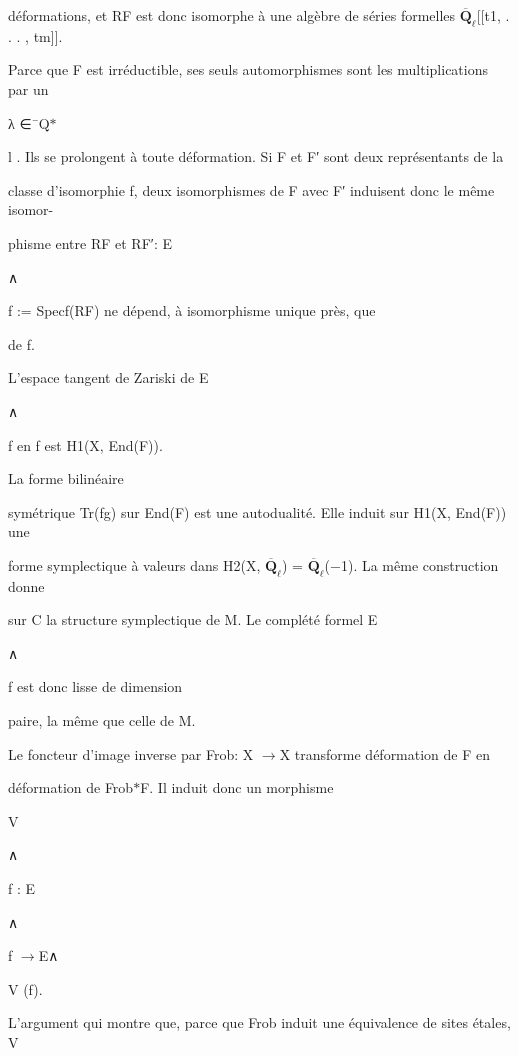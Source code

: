 \documentclass[11pt]{article}
\begin{document}
\noindent déformations, et RF est donc isomorphe à une algèbre de séries formelles \(\overline{\mathbf Q}_{\ell}\)[[t1, . . . , tm]].\par
\noindent Parce que F est irréductible, ses seuls automorphismes sont les multiplications par un\par
\noindent λ ∈¯Q\(*\)\par
\noindent l . Ils se prolongent à toute déformation. Si F et F′ sont deux représentants de la\par
\noindent classe d’isomorphie f, deux isomorphismes de F avec F′ induisent donc le même isomor-\par
\noindent phisme entre RF et RF′: E\par
\noindent ∧\par
\noindent f := Specf(RF) ne dépend, à isomorphisme unique près, que\par
\noindent de f.\par
\noindent L’espace tangent de Zariski de E\par
\noindent ∧\par
\noindent f en f est H1(X, End(F)).\par
\noindent La forme bilinéaire\par
\noindent symétrique Tr(fg) sur End(F) est une autodualité. Elle induit sur H1(X, End(F)) une\par
\noindent forme symplectique à valeurs dans H2(X, \(\overline{\mathbf Q}_{\ell}\)) = \(\overline{\mathbf Q}_{\ell}\)(−1). La même construction donne\par
\noindent sur C la structure symplectique de M. Le complété formel E\par
\noindent ∧\par
\noindent f est donc lisse de dimension\par
\noindent paire, la même que celle de M.\par
\noindent Le foncteur d’image inverse par Frob: X \(\to\)X transforme déformation de F en\par
\medskip
\noindent déformation de Frob\(*\)F. Il induit donc un morphisme\par
\noindent V\par
\noindent ∧\par
\noindent f : E\par
\noindent ∧\par
\noindent f \(\to\)E∧\par
\noindent V (f).\par
\noindent L’argument qui montre que, parce que Frob induit une équivalence de sites étales, V\par
\end{document}
